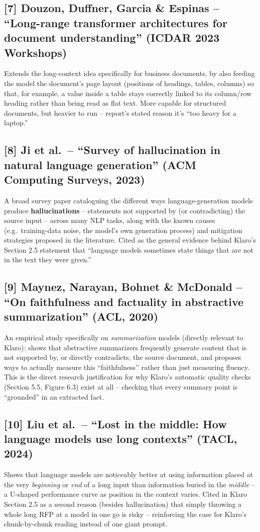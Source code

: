 \documentclass[11pt,a4paper]{article}
\begin{document}
\subsection*{[7] Douzon, Duffner, Garcia \& Espinas -- ``Long-range transformer architectures for
document understanding'' (ICDAR 2023 Workshops)}
Extends the long-context idea specifically for business documents, by also feeding the model the
document's page layout (positions of headings, tables, columns) so that, for example, a value inside
a table stays correctly linked to its column/row heading rather than being read as flat text. More
capable for structured documents, but heavier to run -- report's stated reason it's ``too heavy for
a laptop.''

\subsection*{[8] Ji et al.\ -- ``Survey of hallucination in natural language generation'' (ACM
Computing Surveys, 2023)}
\label{sec:hallucination}
A broad survey paper cataloguing the different ways language-generation models produce
\textbf{hallucinations} -- statements not supported by (or contradicting) the source input -- across
many NLP tasks, along with the known causes (e.g.\ training-data noise, the model's own generation
process) and mitigation strategies proposed in the literature. Cited as the general evidence behind
Klaro's Section 2.5 statement that ``language models sometimes state things that are not in the text
they were given.''

\subsection*{[9] Maynez, Narayan, Bohnet \& McDonald -- ``On faithfulness and factuality in
abstractive summarization'' (ACL, 2020)}
An empirical study specifically on \emph{summarization} models (directly relevant to Klaro): shows
that abstractive summarizers frequently generate content that is not supported by, or directly
contradicts, the source document, and proposes ways to actually measure this ``faithfulness'' rather
than just measuring fluency. This is the direct research justification for why Klaro's automatic
quality checks (Section 5.5, Figure 6.3) exist at all -- checking that every summary point is
``grounded'' in an extracted fact.

\subsection*{[10] Liu et al.\ -- ``Lost in the middle: How language models use long contexts''
(TACL, 2024)}
Shows that language models are noticeably better at using information placed at the very
\emph{beginning} or \emph{end} of a long input than information buried in the \emph{middle} -- a
U-shaped performance curve as position in the context varies. Cited in Klaro Section 2.5 as a second
reason (besides hallucination) that simply throwing a whole long RFP at a model in one go is risky --
reinforcing the case for Klaro's chunk-by-chunk reading instead of one giant prompt.
\end{document}
